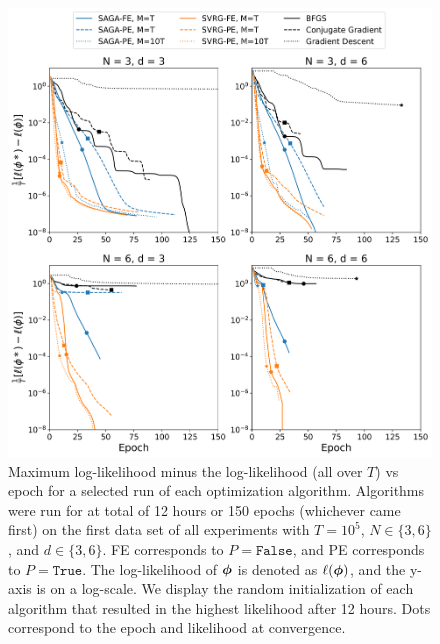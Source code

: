 \begin{figure}[h]
    \centering
    \includegraphics[width=5.5in]{../plt/log-like_v_epoch_T-100000-000.png}
    \caption{
    Maximum log-likelihood minus the log-likelihood (all over $T$) vs epoch for a selected run of each optimization algorithm. Algorithms were run for at total of 12 hours or 150 epochs (whichever came first) on the first data set of all experiments with $T=10^{5}$, $N \in \{3,6\}$, and $d \in \{3,6\}$. FE corresponds to $P = \texttt{False}$, and PE corresponds to $P = \texttt{True}$.
    The log-likelihood of $\boldsymbol{\phi}$ is denoted as $\ell(\boldsymbol{\phi})$, and the y-axis is on a log-scale. We display the random initialization of each algorithm that resulted in the highest likelihood after 12 hours. Dots correspond to the epoch and likelihood at convergence. 
    }
    \label{fig:ll_trace_sim}
\end{figure}
